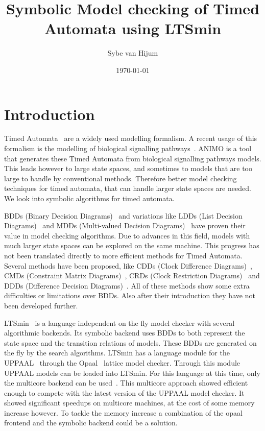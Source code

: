\documentclass[11pt]{article}
\begin{document}
\newtheorem{mydef}{Definition}
\title{Symbolic Model checking of Timed Automata using LTSmin}
\author{Sybe van Hijum}
\date{\today}
\maketitle

\tableofcontents

\section{Introduction}
Timed Automata~\cite{Alur1994183} are a widely used modelling formalism. A recent usage of this formalism is the modelling of biological signalling pathways~\cite{DBLP:conf/bibe/SchivoSWCVKLPP12}. ANIMO is a tool that generates these Timed Automata from biological signalling pathways models. This leads however to large state spaces, and sometimes to models that are too large to handle by conventional methods. Therefore better model checking techniques for timed automata, that can handle larger state spaces are needed. We look into symbolic algorithms for timed automata.

BDDs (Binary Decision Diagrams)~\cite{Akers:1978:BDD:1310167.1310815,1676819} and variations like LDDs (List Decision Diagrams)~\cite{so62465} and MDDs (Multi-valued Decision Diagrams)~\cite{129849} have proven their value in model checking algorithms. Due to advances in this field, models with much larger state spaces can be explored on the same machine. This progress has not been translated directly to more efficient methods for Timed Automata. Several methods have been proposed, like CDDs (Clock Difference Diagrams)~\cite{BRICS19491}, CMDs (Constraint Matrix Diagrams)~\cite{5702245}, CRDs (Clock Restriction Diagrams)~\cite{crds} and DDDs (Difference Decision Diagrams)~\cite{ddds, ddd-datastructure-99}. All of these methods show some extra difficulties or limitations over BDDs. Also after their introduction they have not been developed further.

LTSmin~\cite{eemcs18152,ltsmin-mc:nmf2011} is a language independent on the fly model checker with several algorithmic backends. Its symbolic backend uses BDDs to both represent the state space and the transition relations of models. These BDDs are generated on the fly by the search algorithms. LTSmin has a language module for the UPPAAL~\cite{UPPAAL} through the Opaal~\cite{opaal} lattice model checker. Through this module UPPAAL models can be loaded into LTSmin. For this language at this time, only the multicore backend can be used~\cite{eemcs21972}. This multicore approach showed efficient enough to compete with the latest version of the UPPAAL model checker. It showed significant speedups on multicore machines, at the cost of some memory increase however. To tackle the memory increase a combination of the opaal frontend and the symbolic backend could be a solution.
\end{document}
